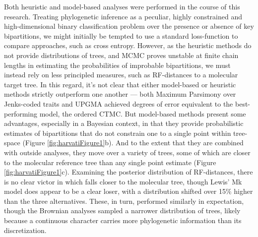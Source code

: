 \documentclass[10pt, twocolumn, twoside]{article}
\begin{document}
Both heuristic and model-based analyses were performed in the course of this research. Treating phylogenetic inference as a peculiar, highly constrained and high-dimensional binary classification problem over the presence or absence of key bipartitions, we might initially be tempted to use a standard loss-function to compare approaches, such as cross entropy. However, as the heuristic methods do not provide distributions of trees, and MCMC proves unstable at finite chain lengths in estimating the probabilities of improbable bipartitions, we must instead rely on less principled measures, such as RF-distances to a molecular target tree. In this regard, it's not clear that either model-based or heuristic methods strictly outperform one another --- both Maximum Parsimony over Jenks-coded traits and UPGMA achieved degrees of error equivalent to the best-performing model, the ordered CTMC. But model-based methods present some advantages, especially in a Bayesian context, in that they provide probabilistic estimates of bipartitions that do not constrain one to a single point within tree-space (Figure \ref{fig:harvatiFigure1}b). And to the extent that they are combined with outside analyses, they move over a variety of trees, some of which are closer to the molecular reference tree than any single point estimate (Figure \ref{fig:harvatiFigure1}c). Examining the posterior distribution of RF-distances, there is no clear victor in which falls closer to the molecular tree, though Lewis' Mk model does appear to be a clear loser, with a distribution shifted over 15\% higher than the three alternatives. These, in turn, performed similarly in expectation, though the Brownian analyses sampled a narrower distribution of trees, likely because a continuous character carries more phylogenetic information than its discretization. 
\end{document}
